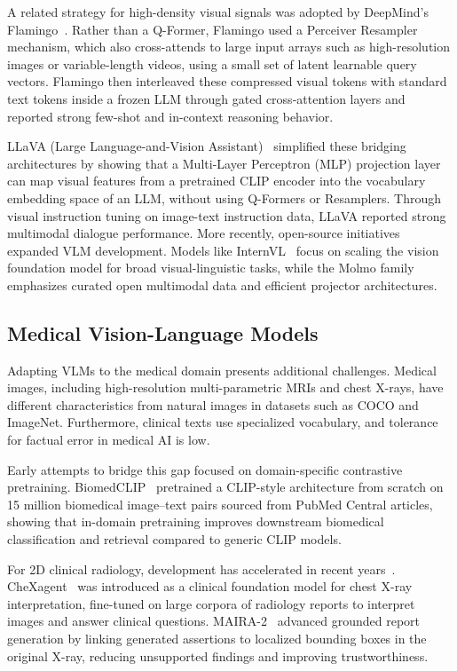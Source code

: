A related strategy for high-density visual signals was adopted by DeepMind's Flamingo~\cite{alayrac2022flamingo}. Rather than a Q-Former, Flamingo used a Perceiver Resampler mechanism, which also cross-attends to large input arrays such as high-resolution images or variable-length videos, using a small set of latent learnable query vectors. Flamingo then interleaved these compressed visual tokens with standard text tokens inside a frozen LLM through gated cross-attention layers and reported strong few-shot and in-context reasoning behavior.

LLaVA (Large Language-and-Vision Assistant)~\cite{liu2024visual} simplified these bridging architectures by showing that a Multi-Layer Perceptron (MLP) projection layer can map visual features from a pretrained CLIP encoder into the vocabulary embedding space of an LLM, without using Q-Formers or Resamplers. Through visual instruction tuning on image-text instruction data, LLaVA reported strong multimodal dialogue performance. More recently, open-source initiatives expanded VLM development. Models like InternVL~\cite{chen2023internvl} focus on scaling the vision foundation model for broad visual-linguistic tasks, while the Molmo family~\cite{deitke2024molmo} emphasizes curated open multimodal data and efficient projector architectures.

\subsection{Medical Vision-Language Models}

Adapting VLMs to the medical domain presents additional challenges. Medical images, including high-resolution multi-parametric MRIs and chest X-rays, have different characteristics from natural images in datasets such as \ac{COCO} and ImageNet. Furthermore, clinical texts use specialized vocabulary, and tolerance for factual error in medical \ac{AI} is low.

Early attempts to bridge this gap focused on domain-specific contrastive pretraining. BiomedCLIP~\cite{zhang2023biomedclip} pretrained a CLIP-style architecture from scratch on 15 million biomedical image--text pairs sourced from PubMed Central articles, showing that in-domain pretraining improves downstream biomedical classification and retrieval compared to generic CLIP models.

For 2D clinical radiology, development has accelerated in recent years~\cite{wang2025rrgsurvey}. CheXagent~\cite{chen2024chexagent} was introduced as a clinical foundation model for chest X-ray interpretation, fine-tuned on large corpora of radiology reports to interpret images and answer clinical questions. MAIRA-2~\cite{bannur2024maira} advanced grounded report generation by linking generated assertions to localized bounding boxes in the original X-ray, reducing unsupported findings and improving trustworthiness.

